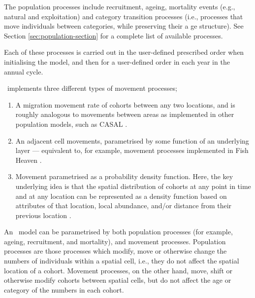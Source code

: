 The population processes include recruitment, ageing,  mortality events (e.g., natural and exploitation) and category transition processes (i.e., processes that move individuals between categories, while preserving their a
ge structure). See Section \ref{sec:population-section} for a complete list of available processes.

Each of these processes is carried out in the user-defined prescribed order when initialising the model, and then for a user-defined order in each year in the annual cycle.

\SPM\ implements three different types of movement processes;
\begin{enumerate}
	\item  A migration movement rate of cohorts between any two locations, and is roughly analogous to movements between areas as implemented in other population models, such as CASAL \citep{1388}. \NYI
	\item An adjacent cell movements, parametrised by some function of an underlying layer --- equivalent to, for example, movement processes implemented in Fish Heaven \citep{1136,1135}. \NYI
	\item Movement parametrised as a probability density function. Here, the key underlying idea is that the spatial distribution of cohorts at any point in time and at any location can be represented as a density function based on attributes of that location, local abundance, and/or distance from their previous location \citep{1366,1367}. 
\end{enumerate}

An \SPM\ model can be parametrised by both population processes (for example, ageing, recruitment, and mortality), and movement processes. Population processes are those processes which modify, move or otherwise change the numbers of individuals within a spatial cell, i.e., they do not affect the spatial location of a cohort. Movement processes, on the other hand, move, shift or otherwise modify cohorts between spatial cells, but do not affect the age or category of the numbers in each cohort. 

\subsection{}

